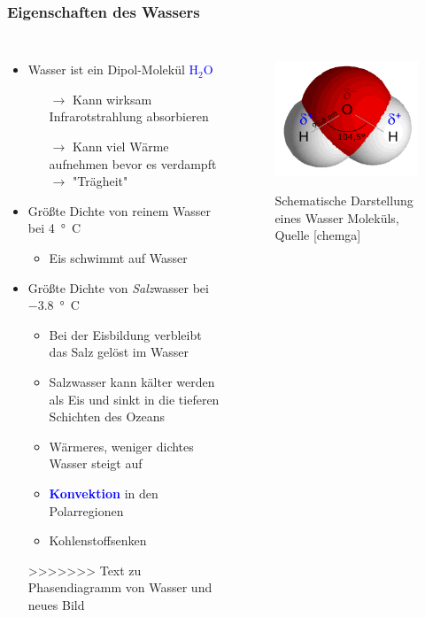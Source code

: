 \begin{frame}
	\frametitle{Eigenschaften des Wassers} %
	\begin{columns}
		\begin{itemize}
			\item Wasser ist ein Dipol-Molekül \textcolor{blue}{H$_2$O}
			\begin{itemize}
				\item[$\rightarrow$] Kann wirksam Infrarotstrahlung absorbieren
				\item[$\rightarrow$] Kann viel Wärme aufnehmen bevor es verdampft $\rightarrow$ "Trägheit"
			\end{itemize}
			\item<2-> Größte Dichte von reinem Wasser bei \SI{4}{°C}
			\begin{itemize}
				\item<2->[$\rightarrow$] Eis schwimmt auf Wasser
			\end{itemize}
			\item<3->Größte Dichte von \textit{Salz}wasser bei \SI{-3,8}{°C}
			\begin{itemize}
				\item<3-> [] Bei der Eisbildung verbleibt das Salz gelöst im Wasser
				\item<3-> [$\rightarrow$] Salzwasser kann kälter werden als Eis und sinkt in die tieferen Schichten des Ozeans
				\item<3-> [$\rightarrow$] Wärmeres, weniger dichtes Wasser steigt auf
				\item<3-> [] \textbf{\textcolor{blue}{Konvektion}} in den Polarregionen
				\item<3-> [$\rightarrow$] Kohlenstoffsenken
			\end{itemize}
>>>>>>> Text zu Phasendiagramm von Wasser und neues Bild
		\end{itemize}
		\begin{figure}
			\includegraphics[scale=0.7]{bilder/wasser_molekuel}\\		\caption{Schematische Darstellung eines Wasser Moleküls, Quelle [chemga]}

\end{figure}
\end{columns}
\end{frame}
